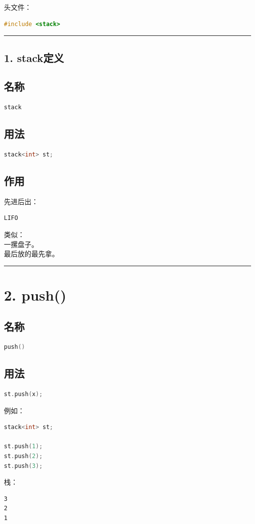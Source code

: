 \documentclass[10pt,twocolumn]{extarticle}
\begin{document}
头文件：
\begin{lstlisting}[language=C++]
#include <stack>
\end{lstlisting}

\noindent\rule{\linewidth}{0.4pt}

\subsection{1. stack定义}

\subsection{名称}
\begin{lstlisting}[language=C++]
stack
\end{lstlisting}

\subsection{用法}
\begin{lstlisting}[language=C++]
stack<int> st;
\end{lstlisting}

\subsection{作用}
先进后出：
\begin{lstlisting}
LIFO
\end{lstlisting}
类似：\\
一摞盘子。\\
最后放的最先拿。

\noindent\rule{\linewidth}{0.4pt}

\section{2. push()}

\subsection{名称}
\begin{lstlisting}[language=C++]
push()
\end{lstlisting}

\subsection{用法}
\begin{lstlisting}[language=C++]
st.push(x);
\end{lstlisting}
例如：
\begin{lstlisting}[language=C++]
stack<int> st;

st.push(1);
st.push(2);
st.push(3);
\end{lstlisting}
栈：
\begin{lstlisting}
3
2
1
\end{lstlisting}
\end{document}
